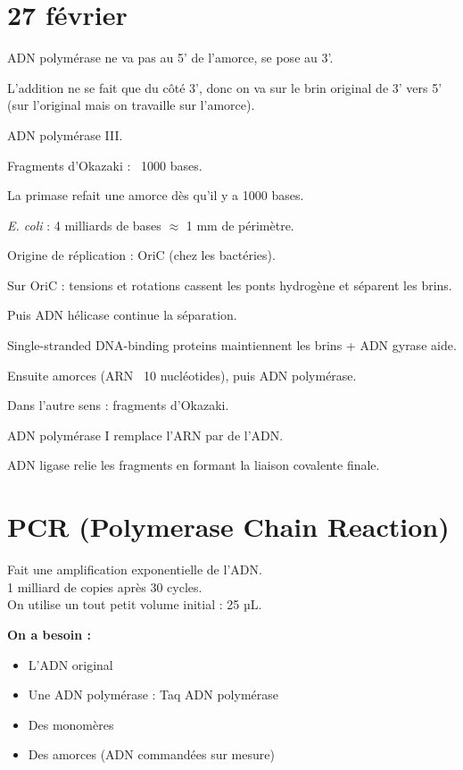 \documentclass[11pt]{article}
\begin{document}
\section*{27 février}

ADN polymérase ne va pas au 5' de l'amorce, se pose au 3'.

L'addition ne se fait que du côté 3', donc on va sur le brin original de 3' vers 5' (sur l'original mais on travaille sur l'amorce).

ADN polymérase III.

Fragments d'Okazaki : ~1000 bases.

La primase refait une amorce dès qu'il y a 1000 bases.

\textit{E. coli} : 4 milliards de bases $\approx$ 1 mm de périmètre.

Origine de réplication : OriC (chez les bactéries).

Sur OriC : tensions et rotations cassent les ponts hydrogène et séparent les brins.

Puis ADN hélicase continue la séparation.

Single-stranded DNA-binding proteins maintiennent les brins + ADN gyrase aide.

Ensuite amorces (ARN ~10 nucléotides), puis ADN polymérase.

Dans l'autre sens : fragments d'Okazaki.

ADN polymérase I remplace l'ARN par de l'ADN.

ADN ligase relie les fragments en formant la liaison covalente finale.




\section*{PCR (Polymerase Chain Reaction)}

Fait une amplification exponentielle de l'ADN.\\
1 milliard de copies après 30 cycles.\\
On utilise un tout petit volume initial : 25 µL.

\vspace{0.3cm}

\textbf{On a besoin :}
\begin{itemize}
    \item L'ADN original
    \item Une ADN polymérase : Taq ADN polymérase
    \item Des monomères
    \item Des amorces (ADN commandées sur mesure)
\end{itemize}
\end{document}
